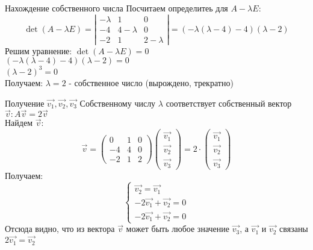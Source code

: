 
\begin{frame}{Нахождение собственного числа}
Посчитаем определитеь для $A-\lambda E$:
\[
\det(A-\lambda E) = \left|\begin{array}{ccc}
        -\lambda & 1 & 0 \\
        -4 & 4-\lambda & 0 \\
        -2 & 1 & 2-\lambda
        \end{array}\right|=(-\lambda(\lambda - 4)-4)(\lambda -2)
\]
Решим уравнение: $\det(A-\lambda E)=0$ \\
$(-\lambda(\lambda - 4)-4)(\lambda -2) =0 $\\
$(\lambda-2)^{3}=0$ \\
Получаем: $\lambda=2$ - собственное число (вырождено, трекратно)
\end{frame}

\begin{frame}{Получение $\vec{v_{1}}, \vec{v_{2}}, \vec{v_{3}}$}
Собственному числу $\lambda$ соответствует собственный вектор $\vec{v}: A\vec{v} = 2\vec{v}$  \\
Найдем $\vec{v}:$
\[
\vec{v}=\left(\begin{array}{lll}
    0 & 1 & 0 \\
    -4 & 4 & 0 \\
    -2 & 1 & 2
\end{array}\right)
\left(\begin{array}{l}
    \vec{v_{1}} \\
    \vec{v_{2}} \\
    \vec{v_{3}} 
\end{array}\right) =
2 \cdot \left(\begin{array}{l}
    \vec{v_{1}} \\
    \vec{v_{2}} \\
    \vec{v_{3}} 
\end{array}\right) 
\]
Получаем:
$$
    \left\{\begin{array}{l}
    \vec{v_{2}} =  \vec{v_{1}} \\
    -2\vec{v_{1}} +  \vec{v_{2}} = 0 \\
    -2\vec{v_{1}} +  \vec{v_{2}} = 0
    \end{array}\right.
$$
Отсюда видно, что из вектора $\vec{v}$ может быть любое значение $\vec{v_{3}}$, а $\vec{v_{1}}$ и $\vec{v_{2}}$ связаны $2\vec{v_{1}} = \vec{v_{2}}$
\end{frame}


